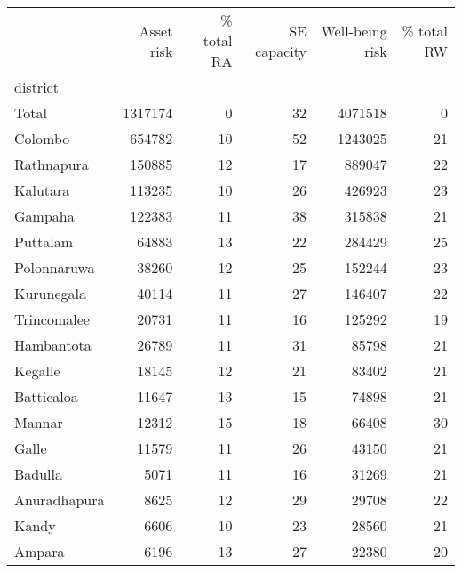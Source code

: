 \begin{tabular}{lrrrrr}
\toprule
{} &  Asset risk &  \% total RA &  SE capacity &  Well-being risk &  \% total RW \\
district     &             &             &              &                  &             \\
\midrule
Total        &     1317174 &           0 &           32 &          4071518 &           0 \\
Colombo      &      654782 &          10 &           52 &          1243025 &          21 \\
Rathnapura   &      150885 &          12 &           17 &           889047 &          22 \\
Kalutara     &      113235 &          10 &           26 &           426923 &          23 \\
Gampaha      &      122383 &          11 &           38 &           315838 &          21 \\
Puttalam     &       64883 &          13 &           22 &           284429 &          25 \\
Polonnaruwa  &       38260 &          12 &           25 &           152244 &          23 \\
Kurunegala   &       40114 &          11 &           27 &           146407 &          22 \\
Trincomalee  &       20731 &          11 &           16 &           125292 &          19 \\
Hambantota   &       26789 &          11 &           31 &            85798 &          21 \\
Kegalle      &       18145 &          12 &           21 &            83402 &          21 \\
Batticaloa   &       11647 &          13 &           15 &            74898 &          21 \\
Mannar       &       12312 &          15 &           18 &            66408 &          30 \\
Galle        &       11579 &          11 &           26 &            43150 &          21 \\
Badulla      &        5071 &          11 &           16 &            31269 &          21 \\
Anuradhapura &        8625 &          12 &           29 &            29708 &          22 \\
Kandy        &        6606 &          10 &           23 &            28560 &          21 \\
Ampara       &        6196 &          13 &           27 &            22380 &          20 \\

\end{tabular}
